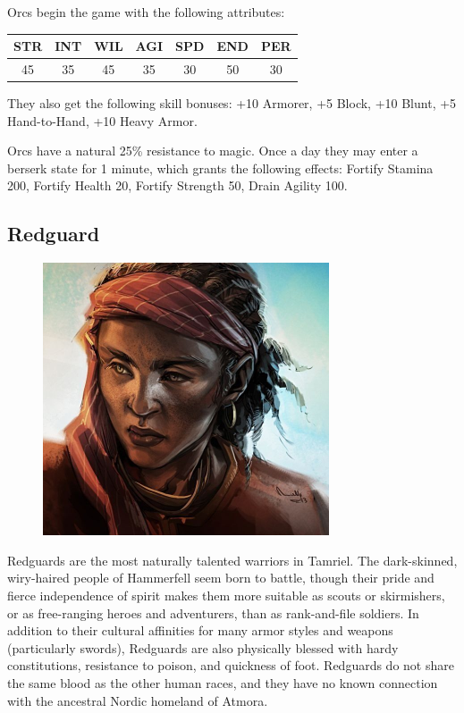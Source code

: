 \documentclass[12pt]{book}
\begin{document}
Orcs begin the game with the following attributes:
\begin{center}
\begin{tabular}{|c|c|c|c|c|c|c|}
\hline
STR & INT & WIL & AGI & SPD & END & PER\\ \hline
45 & 35 & 45 & 35 & 30 & 50 & 30\\ \hline
\end{tabular}
\end{center}

They also get the following skill bonuses: +10 Armorer, +5 Block, +10 Blunt, +5 Hand-to-Hand, +10 Heavy Armor.

Orcs have a natural 25\% resistance to magic. Once a day they may enter a berserk state for 1 minute, which grants the following effects: Fortify Stamina 200, Fortify Health 20, Fortify Strength 50, Drain Agility 100.\\

\subsection{Redguard}
\begin{figure}
	\includegraphics[width=\textwidth]{Redguard.png}
\end{figure}

Redguards are the most naturally talented warriors in Tamriel. The dark-skinned, wiry-haired people of Hammerfell seem born to battle, though their pride and fierce independence of spirit makes them more suitable as scouts or skirmishers, or as free-ranging heroes and adventurers, than as rank-and-file soldiers. In addition to their cultural affinities for many armor styles and weapons (particularly swords), Redguards are also physically blessed with hardy constitutions, resistance to poison, and quickness of foot. Redguards do not share the same blood as the other human races, and they have no known connection with the ancestral Nordic homeland of Atmora.
\end{document}
